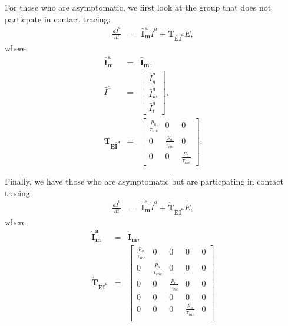 \documentclass[notitlepage, superscriptaddress]{revtex4-2}
\begin{document}
For those who are asymptomatic, we first look at the group that does not particpate in contact tracing:
\begin{eqnarray}
\frac{d\bar{I}^{a}}{dt} &=& \boldsymbol{\bar{I}^{a}_{m}}  \bar{I}^{a} + \boldsymbol{\bar{T}_{\bar{E}\bar{I}^{a}}}  \bar{E}, 
\end{eqnarray}
where:
%
\begin{eqnarray}
\boldsymbol{\bar{I}^{a}_{m}} &=& \boldsymbol{\bar{I}_{m}}, \\ 
%
\bar{I}^{a} &=& 
\begin{bmatrix}
\bar{I}^{a}_{g} \\ \bar{I}^{a}_{w}\\ \bar{I}^{a}_{t}
\end{bmatrix}, \\ 
%
\boldsymbol{\bar{T}_{\bar{E}\bar{I}^{a}}} &=&
\begin{bmatrix}
\frac{p_{a}}{\tau_{inc}}  & 0                 & 0 \\ 
 0          &  \frac{p_{a}}{\tau_{inc}}  & 0 \\ 
 0          & 0                 &  \frac{p_{a}}{\tau_{inc}} 
\end{bmatrix}.
\end{eqnarray}

Finally, we have those who are asymptomatic but are particpating in contact tracing:
\begin{eqnarray}
\frac{d\dot{I}^{a}}{dt} &=& \boldsymbol{\dot{I}^{a}_{m}}  \dot{I}^{a} + \boldsymbol{\dot{T}_{\dot{E}\dot{I}^{a}}}  \dot{E}, 
\end{eqnarray}
where:
%
\begin{eqnarray}
\boldsymbol{\dot{I}^{a}_{m}} &=& \boldsymbol{\dot{I}_{m}}, \\ 
%
\boldsymbol{\dot{T}_{\dot{E}\dot{I}^{a}}} &=&
\begin{bmatrix}
\frac{p_{a}}{\tau_{inc}}  & 0                 & 0 & 0 & 0\\ 
 0          &  \frac{p_{a}}{\tau_{inc}}  & 0 & 0 & 0 \\ 
 0          & 0                 &  \frac{p_{a}}{\tau_{inc}} & 0 & 0 \\ 
0           & 0                 &  0 & 0 & 0 \\ 
0           & 0                 &  0 & \frac{p_{a}}{\tau_{inc}} & 0 \\
\end{bmatrix}
\end{eqnarray}
\end{document}
